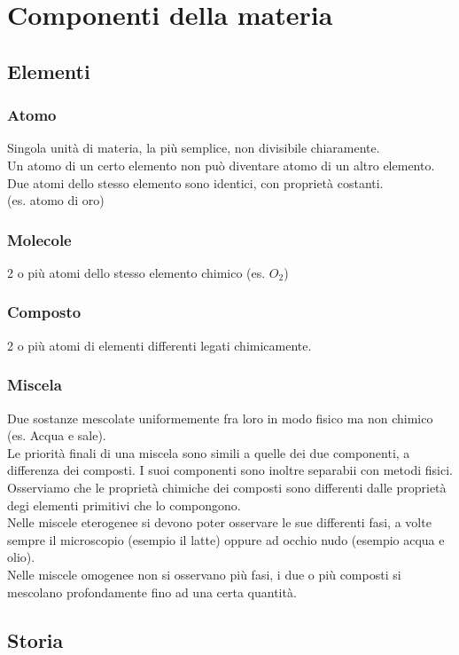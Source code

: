 \section{Componenti della materia}
\subsection{Elementi}
\subsubsection{Atomo}
Singola unità di materia, la più semplice, non divisibile chiaramente.\\
Un atomo di un certo elemento non può diventare atomo di un altro elemento.\\
Due atomi dello stesso elemento sono identici, con proprietà costanti.\\
(es. atomo di oro)
\subsubsection{Molecole}
2 o più atomi dello stesso elemento chimico (es. $O_2$)
\subsubsection{Composto}
2 o più atomi di elementi differenti legati chimicamente.
\subsubsection{Miscela}
Due sostanze mescolate uniformemente fra loro in modo fisico ma non chimico (es. Acqua e sale).\\
Le priorità finali di una miscela sono simili a quelle dei due componenti, a differenza dei composti. I suoi componenti sono inoltre separabii con metodi fisici.\\
Osserviamo che le proprietà chimiche dei composti sono differenti dalle proprietà degi elementi primitivi che lo compongono.\\
Nelle miscele eterogenee si devono poter osservare le sue differenti fasi, a volte sempre il microscopio (esempio il latte) oppure ad occhio nudo (esempio acqua e olio).\\
Nelle miscele omogenee non si osservano più fasi, i due o più composti si mescolano profondamente fino ad una certa quantità.
\subsection{Storia}
